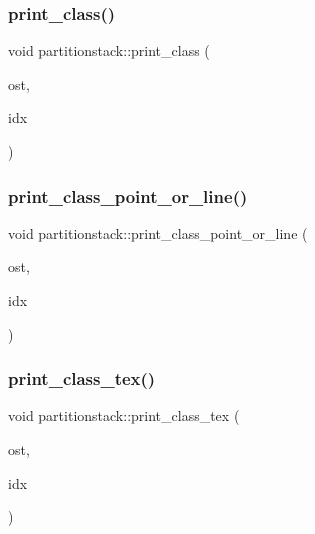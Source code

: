 \mbox{\label{classpartitionstack_a7dbde570bd374f43293acbcafb574e9a}} 
\subsubsection{\texorpdfstring{print\+\_\+class()}{print\_class()}}
{\footnotesize\ttfamily void partitionstack\+::print\+\_\+class (\begin{DoxyParamCaption}\item[{ostream \&}]{ost,  }\item[{\mbox{\hyperlink{galois_8h_a09fddde158a3a20bd2dcadb609de11dc}{I\+NT}}}]{idx }\end{DoxyParamCaption})}

\mbox{\label{classpartitionstack_adea8d0eebaf0b53a74f2fcdf1e63e31d}} 
\subsubsection{\texorpdfstring{print\+\_\+class\+\_\+point\+\_\+or\+\_\+line()}{print\_class\_point\_or\_line()}}
{\footnotesize\ttfamily void partitionstack\+::print\+\_\+class\+\_\+point\+\_\+or\+\_\+line (\begin{DoxyParamCaption}\item[{ostream \&}]{ost,  }\item[{\mbox{\hyperlink{galois_8h_a09fddde158a3a20bd2dcadb609de11dc}{I\+NT}}}]{idx }\end{DoxyParamCaption})}

\mbox{\label{classpartitionstack_addca7119abc7b13416ce0e50155ba2de}} 
\subsubsection{\texorpdfstring{print\+\_\+class\+\_\+tex()}{print\_class\_tex()}}
{\footnotesize\ttfamily void partitionstack\+::print\+\_\+class\+\_\+tex (\begin{DoxyParamCaption}\item[{ostream \&}]{ost,  }\item[{\mbox{\hyperlink{galois_8h_a09fddde158a3a20bd2dcadb609de11dc}{I\+NT}}}]{idx }\end{DoxyParamCaption})}

